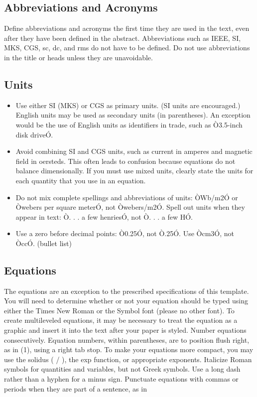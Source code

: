 \documentclass[a4paper, 10pt, conference]{ieeeconf}
\begin{document}
\subsection{Abbreviations and Acronyms} Define abbreviations and acronyms the first time they are used in the text, even after they have been defined in the abstract. Abbreviations such as IEEE, SI, MKS, CGS, sc, dc, and rms do not have to be defined. Do not use abbreviations in the title or heads unless they are unavoidable.

\subsection{Units}

\begin{itemize}

\item Use either SI (MKS) or CGS as primary units. (SI units are encouraged.) English units may be used as secondary units (in parentheses). An exception would be the use of English units as identifiers in trade, such as Ò3.5-inch disk driveÓ.
\item Avoid combining SI and CGS units, such as current in amperes and magnetic field in oersteds. This often leads to confusion because equations do not balance dimensionally. If you must use mixed units, clearly state the units for each quantity that you use in an equation.
\item Do not mix complete spellings and abbreviations of units: ÒWb/m2Ó or Òwebers per square meterÓ, not Òwebers/m2Ó.  Spell out units when they appear in text: Ò. . . a few henriesÓ, not Ò. . . a few HÓ.
\item Use a zero before decimal points: Ò0.25Ó, not Ò.25Ó. Use Òcm3Ó, not ÒccÓ. (bullet list)

\end{itemize}


\subsection{Equations}

The equations are an exception to the prescribed specifications of this template. You will need to determine whether or not your equation should be typed using either the Times New Roman or the Symbol font (please no other font). To create multileveled equations, it may be necessary to treat the equation as a graphic and insert it into the text after your paper is styled. Number equations consecutively. Equation numbers, within parentheses, are to position flush right, as in (1), using a right tab stop. To make your equations more compact, you may use the solidus ( / ), the exp function, or appropriate exponents. Italicize Roman symbols for quantities and variables, but not Greek symbols. Use a long dash rather than a hyphen for a minus sign. Punctuate equations with commas or periods when they are part of a sentence, as in
\end{document}
